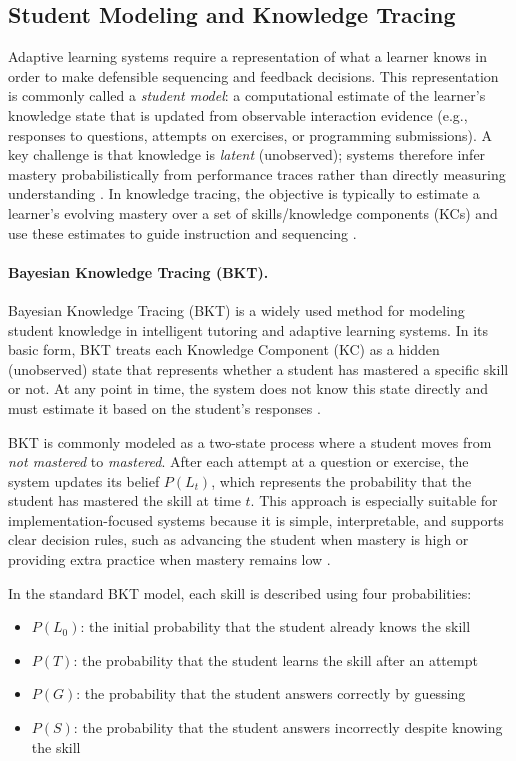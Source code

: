 \documentclass{article}
\begin{document}
\subsection{Student Modeling and Knowledge Tracing}
\label{sec:background-bkt}

Adaptive learning systems require a representation of what a learner knows in order to
make defensible sequencing and feedback decisions. This representation is commonly called a
\textit{student model}: a computational estimate of the learner’s knowledge state that is updated
from observable interaction evidence (e.g., responses to questions, attempts on exercises, or
programming submissions). A key challenge is that knowledge is \textit{latent} (unobserved);
systems therefore infer mastery probabilistically from performance traces rather than directly
measuring understanding \cite{corbett1995}. In knowledge tracing, the objective is typically to
estimate a learner’s evolving mastery over a set of skills/knowledge components (KCs) and use
these estimates to guide instruction and sequencing \cite{corbett1995}.

\paragraph{Bayesian Knowledge Tracing (BKT).}
Bayesian Knowledge Tracing (BKT) is a widely used method for modeling student knowledge in
intelligent tutoring and adaptive learning systems. In its basic form, BKT treats each
Knowledge Component (KC) as a hidden (unobserved) state that represents whether a student
has mastered a specific skill or not. At any point in time, the system does not know this
state directly and must estimate it based on the student’s responses \cite{corbett1995}.

BKT is commonly modeled as a two-state process where a student moves from
\textit{not mastered} to \textit{mastered}. After each attempt at a question or exercise,
the system updates its belief $P(L_t)$, which represents the probability that the student
has mastered the skill at time $t$. This approach is especially suitable for
implementation-focused systems because it is simple, interpretable, and supports clear
decision rules, such as advancing the student when mastery is high or providing extra
practice when mastery remains low \cite{corbett1995}.

In the standard BKT model, each skill is described using four probabilities:
\begin{itemize}
    \item $P(L_0)$: the initial probability that the student already knows the skill
    \item $P(T)$: the probability that the student learns the skill after an attempt
    \item $P(G)$: the probability that the student answers correctly by guessing
    \item $P(S)$: the probability that the student answers incorrectly despite knowing the skill
\end{itemize}
\end{document}
